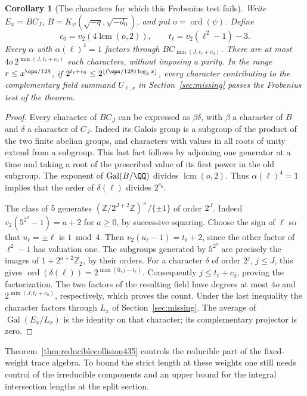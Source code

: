 \documentclass[a4paper,11pt]{article}
\newtheorem{corollary}[proposition]{Corollary}
\theoremstyle{definition}
\theoremstyle{remark}
\newcommand{\ZZ}{\mathbb Z}\newcommand{\ord}{\operatorname{ord}}
\numberwithin{equation}{section}
\begin{document}
\begin{corollary}[The characters for which this Frobenius test fails]\leavevmode
\label{cor:undistinguished435}
Write \(E_x=B C_J\), \(B=K_\psi(\sqrt{-q},\sqrt{-d_0})\),
and put \(o=\operatorname{ord}(\psi)\). Define
\[
  c_0=v_2(4\operatorname{lcm}(o,2)),\qquad
  t_\ell=v_2(\ell^2-1)-3 .
\]
Every \(\alpha\) with \(\alpha(\ell)^4=1\) factors through
\(B C_{\min(J,t_\ell+c_0)}\). There are at most
\(4o\,2^{\min(J,t_\ell+c_0)}\) such characters, without
imposing a parity. In the range \(r\le x^{\eps/128}\),
if \(2^{t_\ell+c_0}\le 2^{\lfloor(\eps/128)\log_2 x\rfloor}\),
every character contributing to the complementary field
summand \(U_{\ell,r}\) in Section~\ref{sec:missing} passes
the Frobenius test of the theorem.
\end{corollary}
\begin{proof}
Every character of \(B C_J\) can be expressed as
\(\beta\delta\), with \(\beta\) a character of \(B\) and
\(\delta\) a character of \(C_J\). Indeed its Galois group
is a subgroup of the product of the two finite abelian
groups, and characters with values in all roots of unity
extend from a subgroup. This last fact follows by adjoining
one generator at a time and taking a root of the prescribed
value of its first power in the old subgroup. The exponent
of \(\operatorname{Gal}(B/\QQ)\) divides \(\operatorname{lcm}(o,2)\).
Thus \(\alpha(\ell)^4=1\) implies that the order of
\(\delta(\ell)\) divides \(2^{c_0}\).

The class of \(5\) generates
\((\ZZ/2^{J+2}\ZZ)^\times/\{\pm1\}\) of order \(2^J\).
Indeed \(v_2(5^{2^a}-1)=a+2\) for \(a\ge0\), by successive
squaring. Choose the sign of \(\ell\) so that \(u_\ell=\pm\ell\)
is \(1\bmod 4\). Then \(v_2(u_\ell-1)=t_\ell+2\), since
the other factor of \(\ell^2-1\) has valuation one. The
subgroups generated by \(5^{2^a}\) are precisely the images
of \(1+2^{a+2}\ZZ_2\), by their orders. For a character
\(\delta\) of order \(2^j\), \(j\le J\), this gives
\(\operatorname{ord}(\delta(\ell))=2^{\max(0,j-t_\ell)}\).
Consequently \(j\le t_\ell+c_0\), proving the factorization.
The two factors of the resulting field have degrees at most
\(4o\) and \(2^{\min(J,t_\ell+c_0)}\), respectively, which
proves the count. Under the last inequality the character
factors through \(L_x\) of Section~\ref{sec:missing}. The
average of \(\operatorname{Gal}(E_x/L_x)\) is the identity
on that character; its complementary projector is zero.
\end{proof}

Theorem~\ref{thm:reduciblecollision435} controls the reducible
part of the fixed-weight trace algebra. To bound the strict
length at these weights one still needs control of the
irreducible components and an upper bound for the integral
intersection lengths at the split section.
\end{document}
